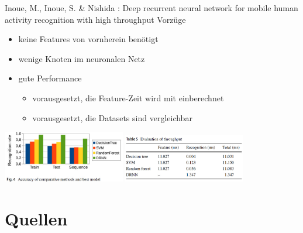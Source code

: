 \documentclass[10pt,%
	wide,%
	xcolor={x11names},%
	hyperref={colorlinks},%
	pantone312,%
	handout,%
	]{beamer}
\begin{document}
\begin{frame}[t]{Inoue, M., Inoue, S. \& Nishida  : Deep recurrent neural network for mobile human activity recognition with high throughput}
Vorzüge
\begin{itemize}
\item keine Features von vornherein benötigt
\item wenige Knoten im neuronalen Netz
\item gute Performance 
	\begin{itemize} 
	\item vorausgesetzt, die Feature-Zeit wird mit einberechnet
	\item vorausgesetzt, die Datasets sind vergleichbar
	\end{itemize}
\end{itemize}

\begin{center}
\includegraphics[width=0.4\textwidth]{img/Inoue2}
\includegraphics[width=0.4\textwidth]{img/Inoue3}
\end{center}

\end{frame}

\section*{Quellen}
\begin{frame}[allowframebreaks,t]{\secname}
\printbibliography
\end{frame}
\end{document}
